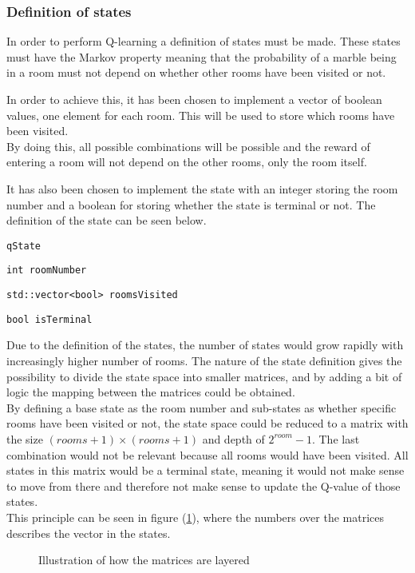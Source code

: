\documentclass[../Head/Main.tex]{subfiles}
\begin{document}
\subsubsection{Definition of states}
In order to perform Q-learning a definition of states must be made. These states must have the Markov property meaning that the probability of a marble being in a room must not depend on whether other rooms have been visited or not.\par 
In order to achieve this, it has been chosen to implement a vector of boolean values, one element for each room. This will be used to store which rooms have been visited.\\
By doing this, all possible combinations will be possible and the reward of entering a room will not depend on the other rooms, only the room itself.\par 
It has also been chosen to implement the state with an integer storing the room number and a boolean for storing whether the state is terminal or not. The definition of the state can be seen below.
\begin{Indentation}
	\item \texttt{qState} \vspace{-2pt}
	\begin{Indentation}
		\item \texttt{int roomNumber} \vspace{-2pt}
		\item \texttt{std::vector<bool> roomsVisited} \vspace{-2pt}
		\item \texttt{bool isTerminal}
	\end{Indentation}
\end{Indentation}
Due to the definition of the states, the number of states would grow rapidly with increasingly higher number of rooms. The nature of the state definition gives the possibility to divide the state space into smaller matrices, and by adding a bit of logic the mapping between the matrices could be obtained.\\
By defining a base state as the room number and sub-states as whether specific rooms have been visited or not, the state space could be reduced to a matrix with the size $(rooms + 1)\times(rooms + 1)$ and depth of $2^{room}-1$. The last combination would not be relevant because all rooms would have been visited. All states in this matrix would be a terminal state, meaning it would not make sense to move from there and therefore not make sense to update the Q-value of those states.\\
This principle can be seen in figure (\ref{fig:3D-matrix}), where the numbers over the matrices describes the vector in the states.  
\begin{figure}[H]
	\centering
	\scalebox{1}
	{
		
	}
	\caption{Illustration of how the matrices are layered}
	\label{fig:3D-matrix}
\end{figure}
\end{document}

